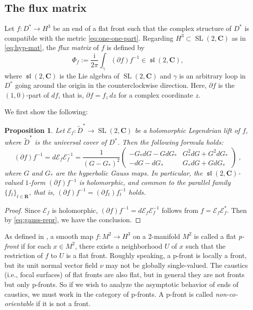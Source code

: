 \documentclass[a4paper]{amsart}
\theoremstyle{plain}
\newtheorem{proposition}[theorem]{Proposition}
\theoremstyle{remark}
\numberwithin{equation}{section}
\begin{document}
\subsection*{The flux matrix}
Let $f \colon D^*\to H^3$ be an end of a flat front such that the
complex structure of $D^*$ is compatible with the metric
\eqref{eq:one-one-part}.
Regarding $H^3\subset {\operatorname{SL}}(2,{\boldsymbol{C}})$ as in \eqref{eq:hyp-mat}, 
the {\it flux matrix\/} of $f$ is defined by 
\begin{equation}\label{eq:flux}
   \Phi_f:=\frac{\mathrm{i}}{2\pi}\int_{\gamma} 
         (\partial f) f^{-1}  \in{\operatorname{\mathfrak{sl}}}(2,{\boldsymbol{C}}), 
\end{equation}
where ${\operatorname{\mathfrak{sl}}}(2,{\boldsymbol{C}})$ is the Lie algebra of ${\operatorname{SL}}(2,{\boldsymbol{C}})$
and $\gamma$ is an arbitrary loop in $D^*$ 
going around the origin in the counterclockwise direction.
Here, $\partial f$ is the $(1,0)$-part of $df$, that is, 
$\partial f = f_z\,dz$ for a complex coordinate $z$.

We first show the following:
\begin{proposition}\label{prop:flux}
 Let ${\mathcal{E}}_f \colon \widetilde D^*\to {\operatorname{SL}}(2,{\boldsymbol{C}})$ be a holomorphic
 Legendrian lift of $f$, where $\widetilde D^*$ is the
 universal cover of $D^*$.  
 Then the following formula holds{\rm :}
 \begin{equation}\label{eq:two-equalities-in-one-line}
    (\partial f) f^{-1}
        =d{\mathcal{E}}^{}_f {\mathcal{E}}_f^{-1}=
	\frac{1}{(G-G_*)^2}
	\begin{pmatrix}
	 -G_*dG-G dG_* & G_*^2dG+G^2 dG_* \\
	 -dG-dG_* & G_*dG+GdG_*
	\end{pmatrix} \; , 
 \end{equation}
 where $G$ and $G_*$ are the hyperbolic Gauss maps.
 In particular, the ${\operatorname{\mathfrak{sl}}}(2,{\boldsymbol{C}})$-valued $1$-form
 $(\partial f) f^{-1}$
 is holomorphic, and common to the parallel family 
 $\{f_t\}_{t\in {\boldsymbol{R}}}$, 
 that is, $(\partial f) f^{-1}=(\partial f^{}_t) f^{-1}_t$
 holds.
\end{proposition}
\begin{proof}
 Since ${\mathcal{E}}_f$ is holomorphic,
 $(\partial f) f^{-1}
     =d{\mathcal{E}}^{}_f {\mathcal{E}}_f^{-1}$ follows from $f={\mathcal{E}}^{}_f{\mathcal{E}}_f^*$.
 Then by \eqref{eq:gauss-repr}, we have the conclusion.
\end{proof}
As defined in \cite{KRUY}, a smooth map
$f \colon M^2\to H^3$ on a $2$-manifold $M^2$ 
is called a flat {\it p-front\/} if for each $x\in M^2$, 
there exists a neighborhood $U$ of $x$ such that 
the restriction of $f$ to $U$ is a flat front.
Roughly speaking,  a p-front is locally a front,
but its unit normal vector field $\nu$ may not be
globally single-valued.
The caustics (i.e., focal surfaces)
of flat fronts are also flat, but in general 
they are not fronts but only p-fronts.  
So if we wish to analyze the asymptotic behavior of
ends of caustics, 
we must work in the category of p-fronts.
A p-front is called {\em non-co-orientable\/} if it is not a front.
\end{document}
